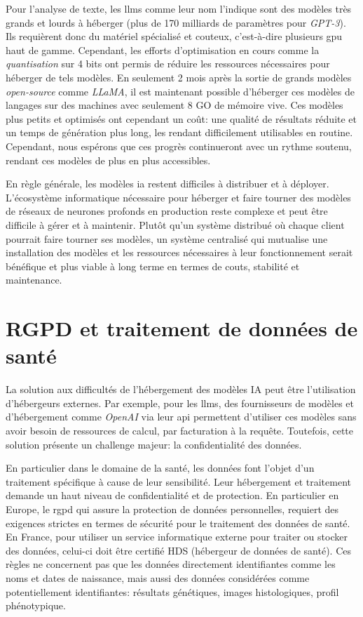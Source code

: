 Pour l'analyse de texte, les \gls{llms} comme leur nom l'indique sont des modèles très grands et lourds à héberger (plus de 170 milliards de paramètres pour \textit{GPT-3}). Ils requièrent donc du matériel spécialisé et couteux, c'est-à-dire plusieurs \gls{gpu} haut de gamme. Cependant, les efforts d'optimisation en cours comme la \textit{quantisation} sur 4 bits ont permis de réduire les ressources nécessaires pour héberger de tels modèles. En seulement 2 mois après la sortie de grands modèles \textit{open-source} comme \textit{LLaMA}, il est maintenant possible d'héberger ces modèles de langages sur des machines avec seulement 8 GO de mémoire vive. Ces modèles plus petits et optimisés ont cependant un coût: une qualité de résultats réduite et un temps de génération plus long, les rendant difficilement utilisables en routine. Cependant, nous espérons que ces progrès continueront avec un rythme soutenu, rendant ces modèles de plus en plus accessibles.

En règle générale, les modèles \gls{ia} restent difficiles à distribuer et à déployer. L'écosystème informatique nécessaire pour héberger et faire tourner des modèles de réseaux de neurones profonds en production reste complexe et peut être difficile à gérer et à maintenir. Plutôt qu'un système distribué où chaque client pourrait faire tourner ses modèles, un système centralisé qui mutualise une installation des modèles et les ressources nécessaires à leur fonctionnement serait bénéfique et plus viable à long terme en termes de couts, stabilité et maintenance.

\section{RGPD et traitement de données de santé}
La solution aux difficultés de l'hébergement des modèles IA peut être l'utilisation d'hébergeurs externes. Par exemple, pour les \gls{llms}, des fournisseurs de modèles et d'hébergement comme \textit{OpenAI} via leur \gls{api} permettent d'utiliser ces modèles sans avoir besoin de ressources de calcul, par facturation à la requête. Toutefois, cette solution présente un challenge majeur: la confidentialité des données.

En particulier dans le domaine de la santé, les données font l'objet d'un traitement spécifique à cause de leur sensibilité. Leur hébergement et traitement demande un haut niveau de confidentialité et de protection. En particulier en Europe, le \gls{rgpd} qui assure la protection de données personnelles, requiert des exigences strictes en termes de sécurité pour le traitement des données de santé. En France, pour utiliser un service informatique externe pour traiter ou stocker des données, celui-ci doit être certifié HDS (hébergeur de données de santé). Ces règles ne concernent pas que les données directement identifiantes comme les noms et dates de naissance, mais aussi des données considérées comme potentiellement identifiantes: résultats génétiques, images histologiques, profil phénotypique. 

